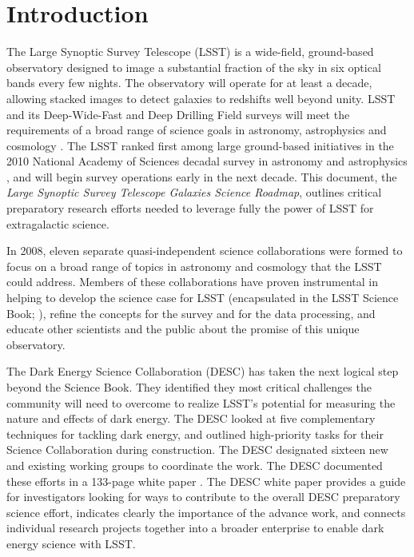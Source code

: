 
\chapter[Introduction]{Introduction}
\label{ch:intro}

{\justify
The Large Synoptic Survey Telescope (LSST) is a wide-field, ground-based
observatory designed to image a substantial fraction of the sky in six optical
bands every few nights. 
The observatory will operate for at least a decade, allowing 
stacked images to detect galaxies to redshifts well beyond unity. LSST and
its Deep-Wide-Fast and Deep Drilling Field surveys will meet 
the requirements of a broad range of science goals in astronomy, astrophysics and cosmology
\citep{ivezic2008a}. 
The LSST ranked first among large ground-based initiatives in the
2010 National Academy of Sciences decadal survey in astronomy and astrophysics \citep{nrc2010a},
and will begin survey operations early in the next decade.
This document, the {\it Large Synoptic Survey Telescope Galaxies Science Roadmap}, outlines critical preparatory research efforts needed 
to leverage fully the power of LSST for extragalactic science. 

In 2008, eleven separate quasi-independent science collaborations were formed to
focus on a broad range of topics in astronomy and cosmology that the LSST could
address. Members of these collaborations have proven instrumental in helping to
develop the science case for LSST (encapsulated in the LSST Science Book;
\citealt{LSSTSciBook}), 
refine the concepts for the survey and for the data processing, and educate
other scientists and the public about the promise of this unique observatory.

The Dark Energy Science Collaboration (DESC) has taken the
next logical step beyond the Science Book. They identified they most critical
challenges the community will need to overcome
to realize LSST’s potential for
measuring the nature and effects of dark energy. The
DESC looked at five complementary
techniques for tackling dark energy, and outlined high-priority tasks for their
Science Collaboration during construction. The DESC designated sixteen 
new and existing working
groups to coordinate the work. The DESC documented these efforts
in a 133-page white paper \citep{LSSTDESC}. The DESC white
paper provides a guide for investigators looking for ways to contribute to the
overall DESC preparatory science effort, 
indicates clearly the importance of the advance work, and 
connects individual research projects together into a broader 
enterprise to enable dark energy science with LSST.

}
